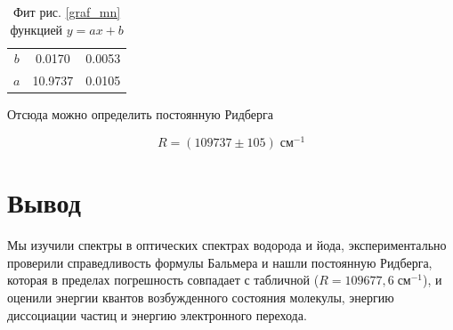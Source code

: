 \documentclass[a4paper, 12pt]{article}%
\begin{document}
	\begin{table}[!h]
		\begin{center}
			\begin{tabular}{|c|c|c|}
				\hline
				& \text{Значение} & \text{Погрешность} \\
				\hline
				 $ b $ & 0.0170 & 0.0053 \\
				$ a $& 10.9737 & 0.0105 \\
				\hline 
			\end{tabular} 
		\end{center}
		\caption{Фит рис. \ref{graf_mn} функцией $ y = ax +b $}
	\end{table}

\newpage

	Отсюда можно определить постоянную Ридберга 
	
\begin{equation}\label{}
	R = (109737 \pm 105) \; \text{см}^{-1} 
\end{equation}
	
	\section{Вывод }
	
	Мы изучили спектры в оптических спектрах водорода и йода, экспериментально проверили справедливость формулы Бальмера и нашли постоянную Ридберга, которая в пределах погрешность совпадает с табличной ($ R = 109 677,6 \; \text{см}^{-1} $), и оценили энергии квантов возбужденного состояния молекулы, энергию диссоциации частиц и энергию электронного перехода.
\end{document}
